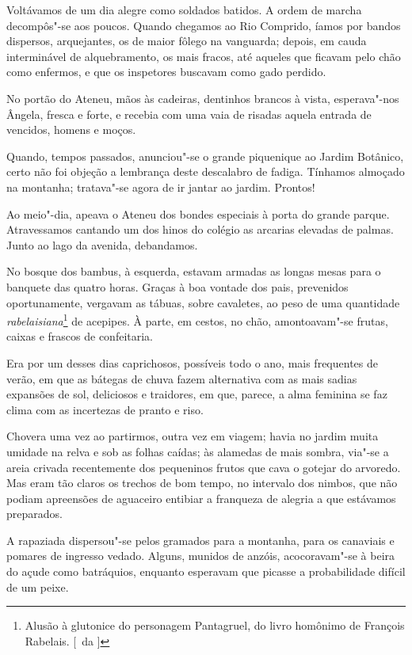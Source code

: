 Voltávamos de um dia alegre como soldados batidos. A ordem de marcha
decompôs"-se aos poucos. Quando chegamos ao Rio Comprido, íamos por
bandos dispersos, arquejantes, os de maior fôlego na
vanguarda; depois, em cauda interminável de alquebramento, os mais
fracos, até aqueles que ficavam pelo chão como enfermos, e que os
inspetores buscavam como gado perdido. 

No portão do Ateneu, mãos às
cadeiras, dentinhos brancos à vista, esperava"-nos Ângela, fresca e
forte, e recebia com uma vaia de risadas aquela entrada de vencidos,
homens e moços. 

Quando, tempos passados, anunciou"-se o grande
piquenique ao Jardim Botânico, certo não foi objeção a lembrança deste
descalabro de fadiga. Tínhamos almoçado na montanha; tratava"-se agora
de ir jantar ao jardim. Prontos! 

Ao meio"-dia, apeava o Ateneu dos
bondes especiais à porta do grande parque. Atravessamos cantando um dos
hinos do colégio as arcarias elevadas de palmas. Junto ao lago da
avenida, debandamos. 

No bosque dos bambus, à esquerda, estavam armadas
as longas mesas para o banquete das quatro horas. Graças à boa vontade
dos pais, prevenidos oportunamente, vergavam as tábuas, sobre
cavaletes, ao peso de uma quantidade \textit{rabelaisiana}\footnote{ Alusão à 
glutonice do personagem Pantagruel, do livro 
homônimo de François Rabelais. [~da ]} de acepipes. À parte,
em cestos, no chão, amontoavam"-se frutas, caixas e frascos de confeitaria. 

Era por um desses dias caprichosos, possíveis todo o ano,
mais frequentes de verão, em que as bátegas de chuva fazem alternativa
com as mais sadias expansões de sol, deliciosos e traidores, em que,
parece, a alma feminina se faz clima com as incertezas de pranto e riso. 

Chovera uma vez ao partirmos, outra vez em viagem; havia no
jardim muita umidade na relva e sob as folhas caídas; às alamedas de
mais sombra, via"-se a areia crivada recentemente dos pequeninos
frutos que cava o gotejar do arvoredo. Mas eram tão claros os trechos
de bom tempo, no intervalo dos nimbos, que não podiam apreensões de
aguaceiro entibiar a franqueza de alegria a que estávamos preparados. 

A rapaziada dispersou"-se pelos gramados para a montanha, para os
canaviais e pomares de ingresso vedado. Alguns, munidos de anzóis,
acocoravam"-se à beira do açude como batráquios, enquanto esperavam
que picasse a probabilidade difícil de um peixe. 

